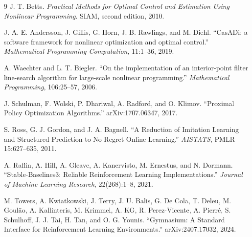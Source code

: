 \documentclass[11pt,a4paper]{article}
\begin{document}
\begin{thebibliography}{9}
J. T. Betts.
\textit{Practical Methods for Optimal Control and Estimation Using
Nonlinear Programming}. SIAM, second edition, 2010.

J. A. E. Andersson, J. Gillis, G. Horn, J. B. Rawlings, and M. Diehl.
``CasADi: a software framework for nonlinear optimization and optimal
control.'' \textit{Mathematical Programming Computation}, 11:1--36,
2019.

A. Waechter and L. T. Biegler.
``On the implementation of an interior-point filter line-search
algorithm for large-scale nonlinear programming.'' \textit{Mathematical
Programming}, 106:25--57, 2006.

J. Schulman, F. Wolski, P. Dhariwal, A. Radford, and O. Klimov.
``Proximal Policy Optimization Algorithms.'' arXiv:1707.06347, 2017.

S. Ross, G. J. Gordon, and J. A. Bagnell.
``A Reduction of Imitation Learning and Structured Prediction to
No-Regret Online Learning.'' \textit{AISTATS}, PMLR 15:627--635, 2011.

A. Raffin, A. Hill, A. Gleave, A. Kanervisto, M. Ernestus, and N. Dormann.
``Stable-Baselines3: Reliable Reinforcement Learning Implementations.''
\textit{Journal of Machine Learning Research}, 22(268):1--8, 2021.

M. Towers, A. Kwiatkowski, J. Terry, J. U. Balis, G. De Cola, T. Deleu,
M. Goul\~ao, A. Kallinteris, M. Krimmel, A. KG, R. Perez-Vicente,
A. Pierr\'e, S. Schulhoff, J. J. Tai, H. Tan, and O. G. Younis.
``Gymnasium: A Standard Interface for Reinforcement Learning
Environments.'' arXiv:2407.17032, 2024.
\end{thebibliography}
\end{document}
